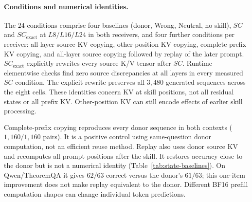 \paragraph{Conditions and numerical identities.}
The $24$ conditions comprise four baselines (donor, Wrong, Neutral,
no skill), $SC$ and $SC_{\mathrm{exact}}$ at $L8/L16/L24$ in both
receivers, and four further conditions per receiver: all-layer source-KV
copying, other-position KV copying, complete-prefix KV copying, and
all-layer source copying followed by replay of the later prompt.
$SC_{\mathrm{exact}}$ explicitly rewrites every source K/V tensor after
$SC$. Runtime elementwise checks find zero source discrepancies at all
layers in every measured $SC$ condition. The explicit rewrite preserves
all $3{,}480$ generated sequences across the eight cells. These identities
concern KV at skill positions, not all residual states or all prefix KV.
Other-position KV can still encode effects of earlier skill processing.

Complete-prefix copying reproduces every donor sequence in both contexts
($1{,}160/1{,}160$ pairs). It is a positive control using same-question
donor computation, not an efficient reuse method. Replay also uses donor
source KV and recomputes all prompt positions after the skill. It restores
accuracy close to the donor but is not a numerical identity
(Table~\ref{tab:state-baselines}). On Qwen/TheoremQA it gives $62/63$
correct versus the donor's $61/63$; this one-item improvement does not
make replay equivalent to the donor. Different BF16 prefill computation
shapes can change individual token predictions.

